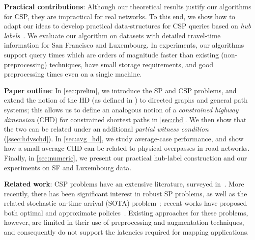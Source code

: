 \noindent\textbf{Practical contributions}: 
Although our theoretical results justify our algorithms for CSP, they are impractical for real networks. 
To this end, we show how to adapt our ideas to develop practical data-structures for CSP queries based on {\em hub labels}~\cite{cohen_definition_hl}. 
We evaluate our algorithm on datasets with detailed travel-time information for San Francisco and Luxembourg.
In experiments, our algorithms support query times which are orders of magnitude faster than existing (non-preprocessing) techniques, have small storage requirements, and good preprocessing times even on a single machine. 

\noindent\textbf{Paper outline}:
In \cref{sec:prelim}, we introduce the SP and CSP problems, and extend the notion of the HD (as defined in \cite{highway2013}) to directed graphs and general path systems; this allows us to define an analogous notion of a \emph{constrained highway dimension} (CHD) for constrained shortest paths in \cref{sec:chd}. 
We then show that the two can be related under an additional \emph{partial witness condition} (\cref{ssec:hdvschd}). 
In \cref{sec:avg_hd}, we study average-case performance, and show how a small average CHD can be related to physical overpasses in road networks. 
Finally, in \cref{sec:numeric}, we present our practical hub-label construction and our experiments on SF and Luxembourg data.


\noindent\textbf{Related work}:
CSP problems have an extensive literature, surveyed in~\cite{csp_survey}. 
More recently, there has been significant interest in robust SP problems, as well as the related stochastic on-time arrival (SOTA) problem~\cite{fan2005arriving}; recent works have proposed both optimal and approximate policies~\cite{sabran2014precomputation,nikolova_discretization}. 
Existing approaches for these problems, however, are limited in their use of preprocessing and augmentation techniques, and consequently do not support the latencies required for mapping applications.


